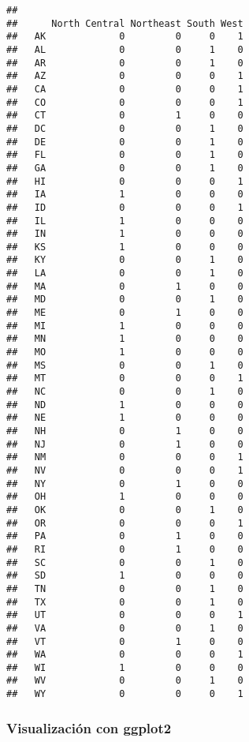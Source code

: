 \documentclass[
]{article}
\begin{document}
\begin{verbatim}
##     
##      North Central Northeast South West
##   AK             0         0     0    1
##   AL             0         0     1    0
##   AR             0         0     1    0
##   AZ             0         0     0    1
##   CA             0         0     0    1
##   CO             0         0     0    1
##   CT             0         1     0    0
##   DC             0         0     1    0
##   DE             0         0     1    0
##   FL             0         0     1    0
##   GA             0         0     1    0
##   HI             0         0     0    1
##   IA             1         0     0    0
##   ID             0         0     0    1
##   IL             1         0     0    0
##   IN             1         0     0    0
##   KS             1         0     0    0
##   KY             0         0     1    0
##   LA             0         0     1    0
##   MA             0         1     0    0
##   MD             0         0     1    0
##   ME             0         1     0    0
##   MI             1         0     0    0
##   MN             1         0     0    0
##   MO             1         0     0    0
##   MS             0         0     1    0
##   MT             0         0     0    1
##   NC             0         0     1    0
##   ND             1         0     0    0
##   NE             1         0     0    0
##   NH             0         1     0    0
##   NJ             0         1     0    0
##   NM             0         0     0    1
##   NV             0         0     0    1
##   NY             0         1     0    0
##   OH             1         0     0    0
##   OK             0         0     1    0
##   OR             0         0     0    1
##   PA             0         1     0    0
##   RI             0         1     0    0
##   SC             0         0     1    0
##   SD             1         0     0    0
##   TN             0         0     1    0
##   TX             0         0     1    0
##   UT             0         0     0    1
##   VA             0         0     1    0
##   VT             0         1     0    0
##   WA             0         0     0    1
##   WI             1         0     0    0
##   WV             0         0     1    0
##   WY             0         0     0    1
\end{verbatim}

\hypertarget{visualizaciuxf3n-con-ggplot2}{%
\subsubsection{Visualización con
ggplot2}\label{visualizaciuxf3n-con-ggplot2}}
\end{document}
